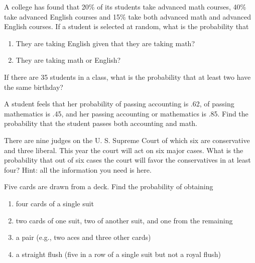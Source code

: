 \begin{puzzle}
    A college has found that 20\% of its students take advanced math courses, 40\% take advanced English courses and 15\% take both advanced math and advanced English courses. If a student is selected at random, what is the probability that
    \begin{enumerate}
        \item They are taking English given that they are taking math?
        \item They are taking math or English?
    \end{enumerate}
\end{puzzle}

\begin{puzzle}
    If there are 35 students in a class, what is the probability that at least two have the same birthday?
\end{puzzle}

\begin{puzzle}
    A student feels that her probability of passing accounting is .62, of passing mathematics is .45, and her passing accounting or mathematics is .85. Find the probability that the student passes both accounting and math.
\end{puzzle}

\begin{puzzle}
    There are nine judges on the U. S. Supreme Court of which six are conservative and three liberal. This year the court will act on six major cases. What is the probability that out of six cases the court will favor the conservatives in at least four? Hint: all the information you need is here.
\end{puzzle}

\begin{puzzle}
    Five cards are drawn from a deck. Find the probability of obtaining
    \begin{enumerate}
        \item four cards of a single suit
        \item two cards of one suit, two of another suit, and one from the remaining
        \item a pair (e.g., two aces and three other cards)
        \item a straight flush (five in a row of a single suit but not a royal flush)
    \end{enumerate}
\end{puzzle}


